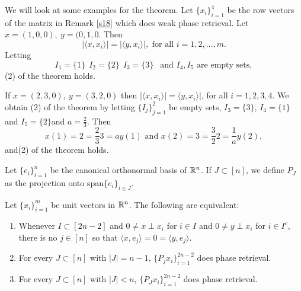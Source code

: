 We will look at some examples for the theorem. Let $\{x_i\}_{i=1}^4$ be the row vectors of the matrix in
Remark \ref{s18} which does weak phase retrieval. Let $x=(1,0,0),\ y=(0,1,0$. Then
\[ |\langle x,x_i\rangle|=|\langle y,x_i\rangle|,\mbox{ for all }i=1,2,\ldots,m.\]
Letting 
\[ I_1=\{1\}\ \ I_2=\{2\}\ \ I_3=\{3\} \ \ \mbox{ and }I_4,I_5\mbox{ are empty sets},\]
(2) of the theorem holds.


If $x=(2,3,0),\ y=(3,2,0)$ then $|\langle x,x_i\rangle|=\langle y,x_i\rangle|$, for
all $i=1,2,3,4.$ We obtain (2) of the theorem by letting $\{I_j\}_{j=1}^2$ be empty sets, $I_3=\{3\}$, $I_4=\{1\}$ 
and $I_5=\{2\}$and
$a=\frac{2}{3}$. Then
\[ x(1)=2=\frac{2}{3}3=ay(1)\mbox{ and }x(2)=3=\frac{3}{2}2=\frac{1}{a}y(2),\]
and(2) of the theorem holds.


\begin{definition}
Let $\{e_i\}_{i=1}^n$ be the canonical orthonormal basis of $\mathbb R^n$. If $J\subset [n]$, we define
$P_J$ as the projection onto span$\{e_i\}_{i\in J}$.
\end{definition}

\begin{theorem}
Let $\{x_i\}_{i=1}^{m}$ be unit vectors in $\mathbb R^n$. The following are equivalent:
\begin{enumerate}
\item Whenever $I\subset [2n-2]$ and $0\not= x\perp x_i$ for $i\in I$ and $0\not= y\perp x_i$ for $i\in I^c$,
there is no $j\in [n]$ so that $\langle x,e_j\rangle = 0 = \langle y,e_j\rangle$.
\item For every $J\subset [n]$ with $|J|=n-1$, $\{P_jx_i\}_{i=1}^{2n-2}$ does phase retrieval.
\item For every $J\subset [n]$ with $|J|<n$, $\{P_Jx_i\}_{i=1}^{2n-2}$ does phase retrieval.
\end{enumerate}
\end{theorem}


